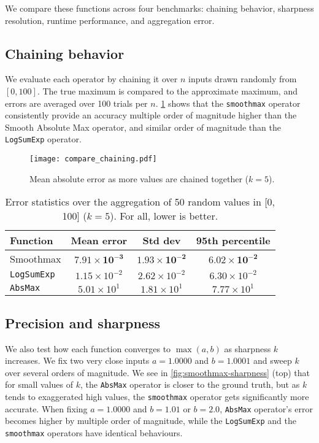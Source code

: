 We compare these functions across four benchmarks: chaining behavior, sharpness resolution, runtime performance, and aggregation error.

\subsection*{Chaining behavior}

We evaluate each operator by chaining it over $n$ inputs drawn randomly from $[0, 100]$. The true maximum is compared to the approximate maximum, and errors are averaged over 100 trials per $n$. \cref{fig:smoothmax-chained-error} shows that the \texttt{smoothmax} operator consistently provide an accuracy multiple order of magnitude higher than the Smooth Absolute Max operator, and similar order of magnitude than the \texttt{LogSumExp} operator. 

\begin{figure}
    \texttt{[image: compare\_chaining.pdf]}
    \caption{Mean absolute error as more values are chained together ($k = 5$).}
    \label{fig:smoothmax-chained-error}
\end{figure}

\begin{table}
    \centering
    \begin{tabular}{l|ccc}
        \toprule
        Function & Mean error & Std dev & 95th percentile \\
        \midrule
        Smoothmax & $\mathbf{7.91 \times 10^{-3}}$ & $\mathbf{1.93 \times 10^{-2}}$ & $\mathbf{6.02 \times 10^{-2}}$ \\
        \texttt{LogSumExp} & $1.15 \times 10^{-2}$ & $2.62 \times 10^{-2}$ & $6.30 \times 10^{-2}$ \\
        \texttt{AbsMax}    & $5.01 \times 10^{1}$  & $1.81 \times 10^{1}$  & $7.77 \times 10^{1}$ \\
        \bottomrule
    \end{tabular}
    \caption{Error statistics over the aggregation of 50 random values in [0, 100] ($k = 5$). For all, lower is better. }
    \label{tab:smoothmax-avg-error}
\end{table}

\subsection*{Precision and sharpness}

We also test how each function converges to $\max(a, b)$ as sharpness $k$ increases. We fix two very close inputs $a = 1.0000$ and $b = 1.0001$ and sweep $k$ over several orders of magnitude. We see in \cref{fig:smoothmax-sharpness} (top) that for small values of $k$, the \texttt{AbsMax} operator is closer to the ground truth, but as $k$ tends to exaggerated high values, the \texttt{smoothmax} operator gets significantly more accurate. When fixing $a = 1.0000$ and $b = 1.01$ or $b = 2.0$, \texttt{AbsMax} operator's error becomes higher by multiple order of magnitude, while the \texttt{LogSumExp} and the \texttt{smoothmax} operators have identical behaviours.

